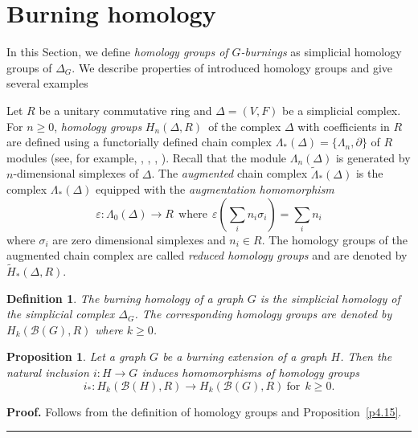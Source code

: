 \documentclass[a4paper, 11pt]{article}
\newtheorem{proposition}[theorem]{Proposition}
\newtheorem{definition}[theorem]{Definition}
\newenvironment{proof}[1][Proof]{\textbf{#1.} }{\ \rule{0.5em}{0.5em}}
\begin{document}
\section{Burning homology }\label{S5}
\setcounter{equation}{0}

In this Section, we define \emph{homology groups   of $G$-burnings}  as simplicial homology groups of $\Delta_G$.  We describe properties of introduced homology groups and  give   several examples




Let $R$ be a unitary commutative ring and $\Delta=(V,F)$ be a simplicial complex.  For $n\geq  0$,   \emph{homology groups} $H_n(\Delta, R) \,$  of the complex $\Delta$ with coefficients in $R$ are defined using a functorially defined chain complex 
$\Lambda_*(\Delta)=\{\Lambda_n, \partial\}$  of $R$ modules (see, for example,  \cite{Hatcher}, \cite{Matousek}, \cite{Munkres}, \cite{Prasolov}). Recall that the module $\Lambda_n(\Delta)$ is  generated by $n$-dimensional simplexes of $\Delta$. The \emph{augmented} chain complex $\widetilde\Lambda_*(\Delta)$  
is the complex $\Lambda_*(\Delta)$ equipped with the \emph{augmentation homomorphism} 
$$
\varepsilon \colon \Lambda_0(\Delta)\to R \ \  \text{where} \  \ \varepsilon\left(\sum_ i n_i \sigma_i\right) =\sum_i n_i 
$$
where  $\sigma_i$ are  zero dimensional simplexes and   $n_i\in R$. The  homology groups of the  augmented chain complex are called \emph{reduced homology  groups} and are denoted by $\widetilde H_*(\Delta,  R)$. 


\begin{definition}\label{d5.1} \rm  The \emph{burning homology}  of a graph $G$   is the simplicial  homology  of the simplicial complex $\Delta_G$. The corresponding homology groups are denoted  by $H_k(\mathcal B(G), R)$ where $k\geq 0$. 
\end{definition}

\begin{proposition}\label{p5.2} Let a graph $G$ be a burning extension of a graph $H$. Then the natural inclusion  $i\colon H\to G$ induces  homomorphisms of
homology groups  
\begin{equation}\label{5.1}
i_*\colon H_k(\mathcal B(H), R)\to H_k(\mathcal B(G), R)  \ \text{for} \ \ k\geq 0.
\end{equation} 
\end{proposition}
\begin{proof}  Follows from  the definition of homology groups and Proposition~\ref{p4.15}. 
\end{proof}
\end{document}
